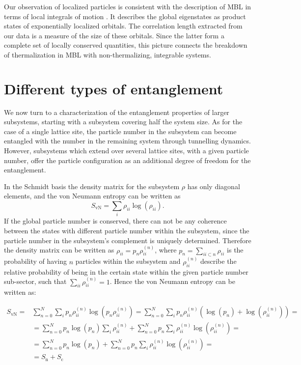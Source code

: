 Our observation of localized particles is consistent with the description of MBL in terms of local integrals of motion \cite{Serbyn2013, Serbyn2013b, Huse2014}. It describes the global eigenstates as product states of exponentially localized orbitals. The correlation length extracted from our data is a measure of the size of these orbitals. Since the latter form a complete set of locally conserved quantities, this picture connects the breakdown of thermalization in MBL with non-thermalizing, integrable systems. 

\section{Different types of entanglement}

We now turn to a characterization of the entanglement properties of larger subsystems, starting with a subsystem covering half the system size. As for the case of a single lattice site, the particle number in the subsystem can become entangled with the number in the remaining system through tunnelling dynamics. However, subsystems which extend over several lattice sites, with a given particle number, offer the particle configuration as an additional degree of freedom for the entanglement. 

In the Schmidt basis the density matrix for the subsystem $\rho$ has only diagonal elements, and the von Neumann entropy can be written as
\begin{equation}
S_\text{vN}=\sum_i \rho_{ii} \log {\left ( \rho_{ii} \right )}.
\end{equation}
If the global particle number is conserved, there can not be any coherence between the states with different particle number
within the subsystem, since the particle number in the subsystem's complement is uniquely determined. Therefore  the density matrix can be written as $\rho_{ii} = p_n \rho_{ii}^{(n)}$, where $p_n = \sum_{ii \subset n} \rho_{ii}$ is the probability of having $n$ particles within the subsystem and $\rho_{ii}^{(n)}$ describe the relative probability of being in the certain state within the given particle number sub-sector, such that $\sum_{ii} \rho_{ii}^{(n)}=1$. Hence the von Neumann entropy can be written as:

\begin{equation}
\begin{aligned}
S_\text{vN}=&\sum_{n=0}^N \sum_i p_n  \rho_{ii}^{(n)} \log {\left (p_n \rho_{ii}^{(n)} \right )}=\sum_{n=0}^N \sum_i p_n  \rho_{ii}^{(n)} \left (\log{\left ( p_n \right )} + \log {\left ( \rho_{ii}^{(n)} \right )} \right ) = \\
&=\sum_{n=0}^N p_n  \log{\left ( p_n \right )}  \sum_i \rho_{ii}^{(n)} + \sum_{n=0}^N p_n \sum_{i} \rho_{ii}^{(n)} \log {\left ( \rho_{ii}^{(n)} \right )} = \\
&=\sum_{n=0}^N p_n  \log{\left ( p_n \right )}  + \sum_{n=0}^N p_n \sum_{i} \rho_{ii}^{(n)} \log {\left ( \rho_{ii}^{(n)} \right )}=\\
&=S_\text{n} + S_\text{c}
\end{aligned}
\end{equation}

